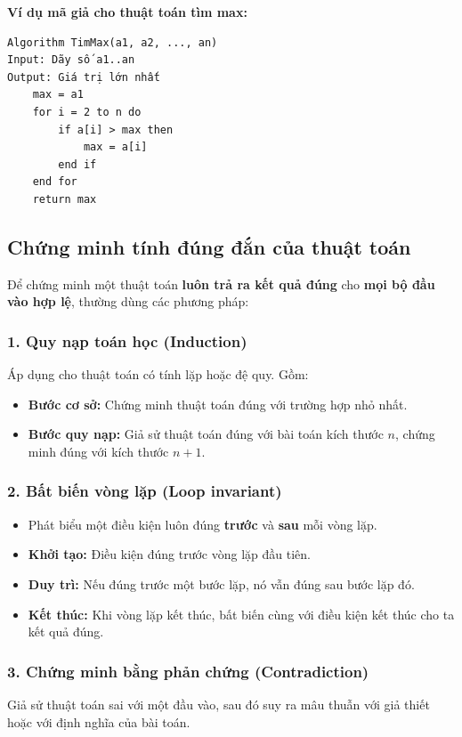 \documentclass[12pt,a4paper]{article}
\begin{document}
\textbf{Ví dụ mã giả cho thuật toán tìm max:}
\begin{verbatim}
Algorithm TimMax(a1, a2, ..., an)
Input: Dãy số a1..an
Output: Giá trị lớn nhất
    max = a1
    for i = 2 to n do
        if a[i] > max then
            max = a[i]
        end if
    end for
    return max
\end{verbatim}

\subsection*{Chứng minh tính đúng đắn của thuật toán}
Để chứng minh một thuật toán \textbf{luôn trả ra kết quả đúng} cho \textbf{mọi bộ đầu vào hợp lệ}, thường dùng các phương pháp:

\subsubsection*{1. Quy nạp toán học (Induction)}
Áp dụng cho thuật toán có tính lặp hoặc đệ quy. Gồm:
\begin{itemize}
    \item \textbf{Bước cơ sở:} Chứng minh thuật toán đúng với trường hợp nhỏ nhất.
    \item \textbf{Bước quy nạp:} Giả sử thuật toán đúng với bài toán kích thước $n$, chứng minh đúng với kích thước $n+1$.
\end{itemize}

\subsubsection*{2. Bất biến vòng lặp (Loop invariant)}
\begin{itemize}
    \item Phát biểu một điều kiện luôn đúng \textbf{trước} và \textbf{sau} mỗi vòng lặp.
    \item \textbf{Khởi tạo:} Điều kiện đúng trước vòng lặp đầu tiên.
    \item \textbf{Duy trì:} Nếu đúng trước một bước lặp, nó vẫn đúng sau bước lặp đó.
    \item \textbf{Kết thúc:} Khi vòng lặp kết thúc, bất biến cùng với điều kiện kết thúc cho ta kết quả đúng.
\end{itemize}

\subsubsection*{3. Chứng minh bằng phản chứng (Contradiction)}
Giả sử thuật toán sai với một đầu vào, sau đó suy ra mâu thuẫn với giả thiết hoặc với định nghĩa của bài toán.
\end{document}

